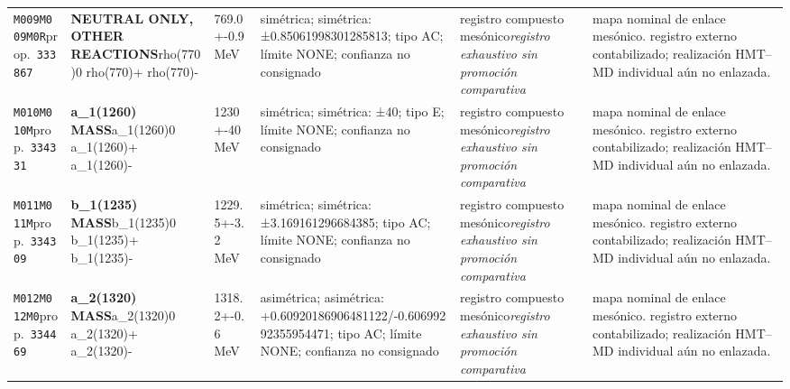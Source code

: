 \begin{landscape}
\begin{longtable}{L{1.85cm}L{4.45cm}L{2.35cm}L{4.05cm}L{3.35cm}L{7.15cm}}
\texttt{M009}\newline \texttt{M009M0R}\newline prop.\ \texttt{333867} & \textbf{NEUTRAL ONLY, OTHER REACTIONS}\newline rho(770)0 \textbar{}\allowbreak{} rho(770)+ \textbar{}\allowbreak{} rho(770)- & 769.0+-0.9\,MeV & simétrica; simétrica: ±0.85061998301285813; tipo AC; límite NONE; confianza no consignado & registro compuesto mesónico\newline \emph{registro exhaustivo sin promoción comparativa} & mapa nominal de enlace mesónico. registro externo contabilizado; realización HMT--MD individual aún no enlazada. \\
\texttt{M010}\newline \texttt{M010M}\newline prop.\ \texttt{334331} & \textbf{a\_\allowbreak{}1(1260) MASS}\newline a\_\allowbreak{}1(1260)0 \textbar{}\allowbreak{} a\_\allowbreak{}1(1260)+ \textbar{}\allowbreak{} a\_\allowbreak{}1(1260)- & 1230+-40\,MeV & simétrica; simétrica: ±40; tipo E; límite NONE; confianza no consignado & registro compuesto mesónico\newline \emph{registro exhaustivo sin promoción comparativa} & mapa nominal de enlace mesónico. registro externo contabilizado; realización HMT--MD individual aún no enlazada. \\
\texttt{M011}\newline \texttt{M011M}\newline prop.\ \texttt{334309} & \textbf{b\_\allowbreak{}1(1235) MASS}\newline b\_\allowbreak{}1(1235)0 \textbar{}\allowbreak{} b\_\allowbreak{}1(1235)+ \textbar{}\allowbreak{} b\_\allowbreak{}1(1235)- & 1229.5+-3.2\,MeV & simétrica; simétrica: ±3.169161296684385; tipo AC; límite NONE; confianza no consignado & registro compuesto mesónico\newline \emph{registro exhaustivo sin promoción comparativa} & mapa nominal de enlace mesónico. registro externo contabilizado; realización HMT--MD individual aún no enlazada. \\
\texttt{M012}\newline \texttt{M012M0}\newline prop.\ \texttt{334469} & \textbf{a\_\allowbreak{}2(1320) MASS}\newline a\_\allowbreak{}2(1320)0 \textbar{}\allowbreak{} a\_\allowbreak{}2(1320)+ \textbar{}\allowbreak{} a\_\allowbreak{}2(1320)- & 1318.2+-0.6\,MeV & asimétrica; asimétrica: +0.60920186906481122/-0.60699292355954471; tipo AC; límite NONE; confianza no consignado & registro compuesto mesónico\newline \emph{registro exhaustivo sin promoción comparativa} & mapa nominal de enlace mesónico. registro externo contabilizado; realización HMT--MD individual aún no enlazada. \\

\end{longtable}
\end{landscape}
